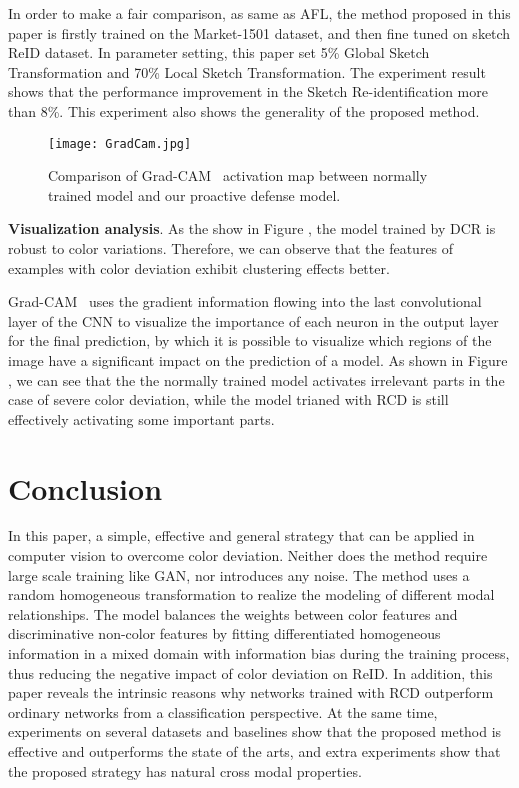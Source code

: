 \documentclass[10pt,twocolumn,letterpaper]{article}
\begin{document}
In order to make a fair comparison, as same as AFL\cite{sketch-criminal}, the method proposed in this paper is firstly trained on the Market-1501 dataset, and then fine tuned on sketch ReID dataset. In parameter setting, this paper set 5\% Global Sketch Transformation and 70\% Local Sketch Transformation. The experiment result shows that the performance improvement in the Sketch Re-identification more than 8\%. This experiment also shows the generality of the proposed method.

\begin{figure}[]
	\setlength{\abovecaptionskip}{0.1cm}
	\setlength{\belowcaptionskip}{-0.4cm}   \centering
	\texttt{[image: GradCam.jpg]}
	\caption{Comparison of Grad-CAM~\cite{Grad-CAM} activation map between normally trained model and our proactive defense model.}
\end{figure}

\textbf{Visualization analysis}. As the show in Figure , the model trained by DCR is robust to color variations. Therefore, we can observe that the features of examples with color deviation exhibit clustering effects better.

Grad-CAM~\cite{Grad-CAM} uses the gradient information flowing into the last convolutional layer of the CNN to visualize the importance of each neuron in the output layer for the final prediction, by which it is possible to visualize which regions of the image have a significant impact on the prediction of a model. As shown in Figure , we can see that the the normally trained model activates irrelevant parts in the case of severe color deviation, while the model trianed with RCD is still effectively activating some important parts.



\section{Conclusion}
In this paper, a simple, effective and general strategy that can be applied in computer vision to overcome color deviation. Neither does the method require large scale training like GAN, nor introduces any noise.  The method uses a random homogeneous transformation to realize the modeling of different modal relationships. The model balances the weights between color features and discriminative non-color features by fitting differentiated homogeneous information in a mixed  domain with information bias during the training process, thus reducing the negative impact of color deviation on ReID. In addition, this paper reveals the intrinsic reasons why networks trained with RCD outperform ordinary networks from a classification perspective. At the same time, experiments on several datasets and baselines show that the proposed method is effective and outperforms the state of the arts, and extra experiments show that the proposed strategy has natural cross modal properties.




{\small


}
\end{document}
